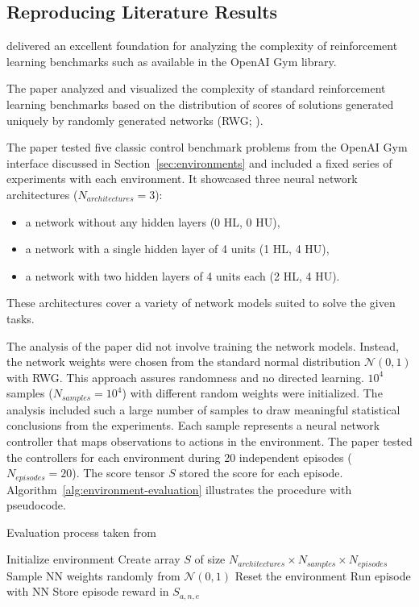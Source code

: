 \subsection{Reproducing Literature Results}
\cite{oller_analyzing_2020} delivered an excellent foundation for analyzing the complexity of reinforcement learning benchmarks such as available in the OpenAI Gym library.

The paper analyzed and visualized the complexity of standard reinforcement learning benchmarks based on the distribution of scores of solutions generated uniquely by randomly generated networks (RWG; \cite{schmidhuber2001evaluating}).

The paper tested five classic control benchmark problems from the OpenAI Gym interface discussed in Section~\ref{sec:environments} and included a fixed series of experiments with each environment. It showcased three neural network architectures ($N_{architectures}=3$):
\begin{itemize}
  \item a network without any hidden layers (0 HL, 0 HU),
  \item a network with a single hidden layer of 4 units (1 HL, 4 HU),
  \item a network with two hidden layers of 4 units each (2 HL, 4 HU).
\end{itemize}
These architectures cover a variety of network models suited to solve the given tasks.

The analysis of the paper did not involve training the network models. Instead, the network weights were chosen from the standard normal distribution $\mathcal{N}(0,1)$ with RWG. This approach assures randomness and no directed learning. $10^4$ samples ($N_{samples}=10^4$) with different random weights were initialized. The analysis included such a large number of samples to draw meaningful statistical conclusions from the experiments. Each sample represents a neural network controller that maps observations to actions in the environment. The paper tested the controllers for each environment during 20 independent episodes ($N_{episodes}=20$). The score tensor $S$ stored the score for each episode. Algorithm~\ref{alg:environment-evaluation} illustrates the procedure with pseudocode.

\begin{algorithm}
\caption{Evaluation process taken from \cite{oller_analyzing_2020}}
\begin{algorithmic}[1]
\State Initialize environment
\State Create array $S$ of size $N_{architectures} \times N_{samples} \times N_{episodes}$
    \State Sample NN weights randomly from $\mathcal{N}(0,1)$
      \State Reset the environment
      \State Run episode with NN
      \State Store episode reward in $S_{a,n,e}$
    \EndFor
\EndFor
\end{algorithmic}
\label{alg:environment-evaluation}
\end{algorithm}

